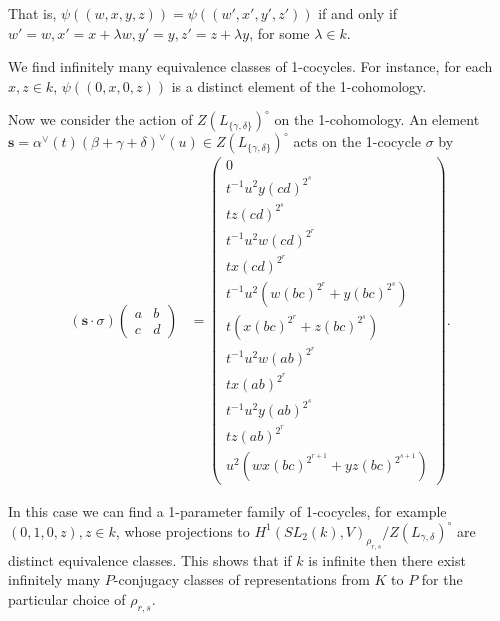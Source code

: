 That is, $\psi((w,x,y,z)) = \psi((w',x', y', z'))$ if and only if $w'=w, x'=x+\lambda w, y'=y, z'=z+\lambda y$, for some $\lambda\in k$.

We find infinitely many equivalence classes of 1-cocycles. For instance, for each $x, z\in k$, $\psi((0,x,0,z))$ is a distinct element of the 1-cohomology.

Now we consider the action of $Z(L_{\{\gamma,\delta\}})^\circ$ on the 1-cohomology. An element $\mathbf{s} = \alpha^\vee(t)(\beta + \gamma + \delta)^\vee(u)\in Z(L_{\{\gamma,\delta\}})^\circ$ acts on the 1-cocycle $\sigma$ by
\begin{align*}
(\mathbf{s}\cdot\sigma)\left(\begin{matrix} a & b \\ c & d\end{matrix}\right)
&=
\left(\begin{matrix}
0 \\
t^{-1}u^{2}y(cd)^{2^s} \\
tz(cd)^{2^s} \\
t^{-1}u^{2}w(cd)^{2^r} \\
tx(cd)^{2^r} \\
t^{-1}u^{2}(w(bc)^{2^r} + y(bc)^{2^s}) \\
t(x(bc)^{2^r} + z(bc)^{2^s}) \\
t^{-1}u^{2}w(ab)^{2^r} \\
tx(ab)^{2^r}  \\
t^{-1}u^{2}y(ab)^{2^s} \\
tz(ab)^{2^r} \\
u^2(wx(bc)^{2^{r+1}} + yz(bc)^{2^{s+1}})
\end{matrix}\right).
\end{align*}

In this case we can find a 1-parameter family of 1-cocycles, for example $(0, 1, 0, z), z\in k$, whose projections to $H^1(SL_2(k), V)_{\rho_{r,s}}/Z(L_{\gamma, \delta})^\circ$ are distinct equivalence classes. This shows that if $k$ is infinite then there exist infinitely many $P$-conjugacy classes of representations from $K$ to $P$ for the particular choice of $\rho_{r,s}$.
